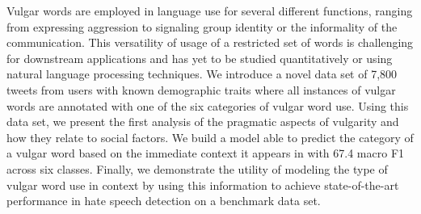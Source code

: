 Vulgar words are employed in language use for several different functions, ranging from expressing aggression to signaling group identity or the informality of the communication. This versatility of usage of a restricted set of words is challenging for downstream applications and has yet to be studied quantitatively or using natural language processing techniques. We introduce a novel data set of 7,800 tweets from users with known demographic traits where all instances of vulgar words are annotated with one of the six categories of vulgar word use. Using this data set, we present the first analysis of the pragmatic aspects of vulgarity and how they relate to social factors. We build a model able to predict the category of a vulgar word based on the immediate context it appears in with 67.4 macro F1 across six classes. Finally, we demonstrate the utility of modeling the type of vulgar word use in context by using this information to achieve state-of-the-art performance in hate speech detection on a benchmark data set.
